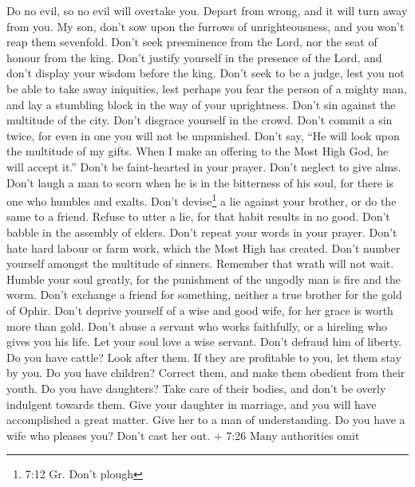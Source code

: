  Do no evil, so no evil will overtake you. 
Depart from wrong, and it will turn away from you.  My son,
don't sow upon the furrows of unrighteousness, and you won't reap them
sevenfold.  Don't seek preeminence from the Lord, nor the
seat of honour from the king.  Don't justify yourself in the
presence of the Lord, and don't display your wisdom before the king.
 Don't seek to be a judge, lest you not be able to take away
iniquities, lest perhaps you fear the person of a mighty man, and lay a
stumbling block in the way of your uprightness.  Don't sin
against the multitude of the city. Don't disgrace yourself in the crowd.
 Don't commit a sin twice, for even in one you will not be
unpunished.  Don't say, ``He will look upon the multitude of
my gifts. When I make an offering to the Most High God, he will accept
it.''  Don't be faint-hearted in your prayer. Don't neglect
to give alms.  Don't laugh a man to scorn when he is in the
bitterness of his soul, for there is one who humbles and exalts.
 Don't devise\footnote{7:12 Gr. Don't plough} a lie against
your brother, or do the same to a friend.  Refuse to utter
a lie, for that habit results in no good.  Don't babble in
the assembly of elders. Don't repeat your words in your prayer.
 Don't hate hard labour or farm work, which the Most High
has created.  Don't number yourself amongst the multitude
of sinners. Remember that wrath will not wait.  Humble your
soul greatly, for the punishment of the ungodly man is fire and the
worm.  Don't exchange a friend for something, neither a
true brother for the gold of Ophir.  Don't deprive yourself
of a wise and good wife, for her grace is worth more than gold.
 Don't abuse a servant who works faithfully, or a hireling
who gives you his life.  Let your soul love a wise servant.
Don't defraud him of liberty.  Do you have cattle? Look
after them. If they are profitable to you, let them stay by you.
 Do you have children? Correct them, and make them obedient
from their youth.  Do you have daughters? Take care of
their bodies, and don't be overly indulgent towards them. 
Give your daughter in marriage, and you will have accomplished a great
matter. Give her to a man of understanding.  Do you have a
wife who pleases you? Don't cast her out. + 7:26 Many authorities omit
